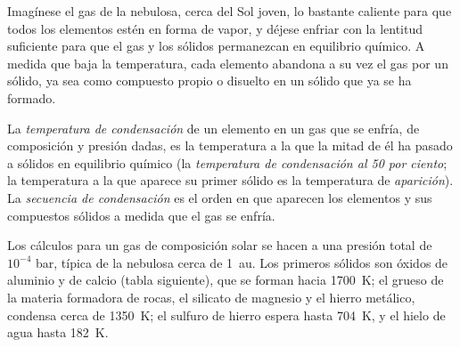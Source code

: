 Imagínese el gas de la nebulosa, cerca del Sol joven, lo bastante caliente para que todos los
elementos estén en forma de vapor, y déjese enfriar con la lentitud suficiente para que el gas y los sólidos
permanezcan en equilibrio químico. A medida que baja la temperatura, cada elemento
abandona a su vez el gas por un sólido, ya sea como compuesto propio o
disuelto en un sólido que ya se ha formado.

\begin{definition}
\label{def:b2:planet-formation-meteorites:condensation}
La \emph{temperatura de condensación} de un
elemento en un gas que se enfría, de composición y presión dadas, es la temperatura
a la que la mitad de él ha pasado a sólidos en equilibrio químico (la
\emph{temperatura de condensación al 50 por ciento}; la temperatura a la que aparece su primer
sólido es la temperatura de \emph{aparición}). La
\emph{secuencia de condensación} es el orden en que
aparecen los elementos y sus compuestos sólidos a medida que el gas se enfría.
\end{definition}

Los cálculos para un gas de composición solar se hacen a una presión total de
$10^{-4}$ bar, típica de la nebulosa cerca de \qty{1}{au}. Los primeros sólidos son
óxidos de aluminio y de calcio (tabla siguiente), que se forman hacia
\qty{1700}{K}; el grueso de la materia formadora de rocas, el silicato de magnesio y
el hierro metálico, condensa cerca de \qty{1350}{K}; el sulfuro de hierro espera hasta
\qty{704}{K}, y el hielo de agua hasta \qty{182}{K}.

